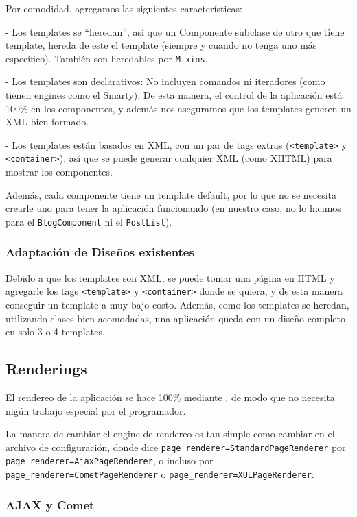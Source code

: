 Por comodidad, agregamos las siguientes características:

- Los templates se ``heredan'', así que un Componente subclase de otro que tiene template, hereda de este el template (siempre y cuando no tenga uno más específico). También son heredables por \verb"Mixins".

- Los templates son declarativos: No incluyen comandos ni iteradores (como tienen engines como el Smarty). De esta manera, el control de la aplicación está 100\% en los componentes, y además nos aseguramos que los templates generen un XML bien formado.

- Los templates están basados en XML, con un par de tags extras (\verb"<template>" y \verb"<container>"), así que se puede generar cualquier XML (como XHTML) para mostrar los componentes.

Además, cada componente tiene un template default, por lo que no se necesita crearle uno para tener la aplicación funcionando (en nuestro caso, no lo hicimos para el \verb"BlogComponent" ni el \verb"PostList").

\subsubsection{Adaptación de Diseños existentes}
\label{sub-templates-adapt}
Debido a que los templates son XML, se puede tomar una página en HTML y agregarle los tags \verb"<template>" y \verb"<container>" donde se quiera, y de esta manera conseguir un template a muy bajo costo. Además, como los templates se heredan, utilizando clases bien acomodadas, una aplicación queda con un diseño completo en solo 3 o 4 templates.

\subsection{Renderings}
\label{sub-render}
El rendereo de la aplicación se hace 100\% mediante \PWB, de modo que no necesita nigún trabajo especial por el programador.

La manera de cambiar el engine de rendereo es tan simple como cambiar en el archivo de configuración, donde dice \verb"page_renderer=StandardPageRenderer" por \verb"page_renderer=AjaxPageRenderer", o incluso por \verb"page_renderer=CometPageRenderer" o \verb"page_renderer=XULPageRenderer".

\subsubsection{AJAX y Comet}

